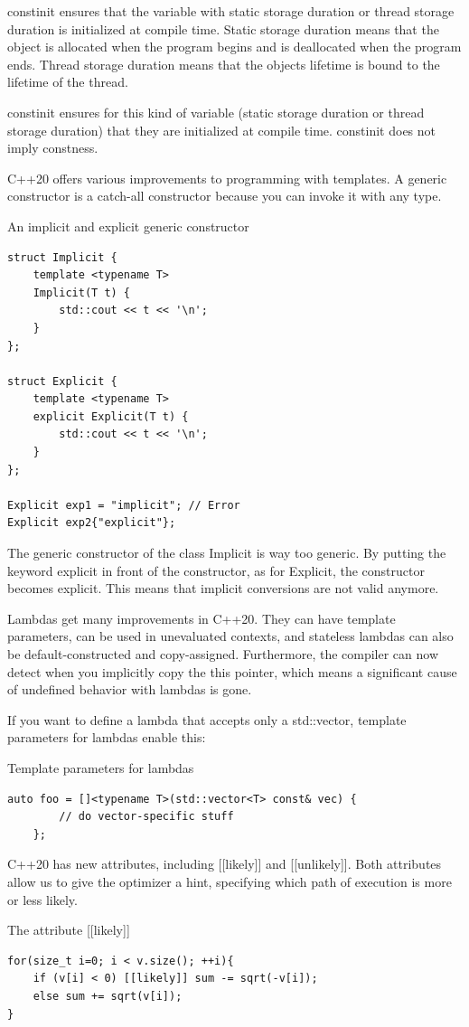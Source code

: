 constinit ensures that the variable with static storage duration or thread storage duration is initialized at compile time. Static storage duration means that the object is allocated when the program begins and is deallocated when the program ends. Thread storage duration means that the objects lifetime is bound to the lifetime of the thread.

constinit ensures for this kind of variable (static storage duration or thread storage duration) that they are initialized at compile time. constinit does not imply constness.


C++20 offers various improvements to programming with templates. A generic constructor is a catch-all constructor because you can invoke it with any type.

\noindent
An implicit and explicit generic constructor
\begin{lstlisting}[style=styleCXX]
struct Implicit {
	template <typename T>
	Implicit(T t) {
		std::cout << t << '\n';
	}
};

struct Explicit {
	template <typename T>
	explicit Explicit(T t) {
		std::cout << t << '\n';
	}
};

Explicit exp1 = "implicit"; // Error
Explicit exp2{"explicit"};
\end{lstlisting}

The generic constructor of the class Implicit is way too generic. By putting the keyword explicit in front of the constructor, as for Explicit, the constructor becomes explicit. This means that implicit conversions are not valid anymore.


Lambdas get many improvements in C++20. They can have template parameters, can be used in unevaluated contexts, and stateless lambdas can also be default-constructed and copy-assigned. Furthermore, the compiler can now detect when you implicitly copy the this pointer, which means a significant cause of undefined behavior with lambdas is gone.

If you want to define a lambda that accepts only a std::vector, template parameters for lambdas enable this:

\noindent
Template parameters for lambdas
\begin{lstlisting}[style=styleCXX]
auto foo = []<typename T>(std::vector<T> const& vec) {
		// do vector-specific stuff
	};
\end{lstlisting}


C++20 has new attributes, including [[likely]] and [[unlikely]]. Both attributes allow us to give the optimizer a hint, specifying which path of execution is more or less likely.

\noindent
The attribute [[likely]]
\begin{lstlisting}[style=styleCXX]
for(size_t i=0; i < v.size(); ++i){
	if (v[i] < 0) [[likely]] sum -= sqrt(-v[i]);
	else sum += sqrt(v[i]);
}
\end{lstlisting}